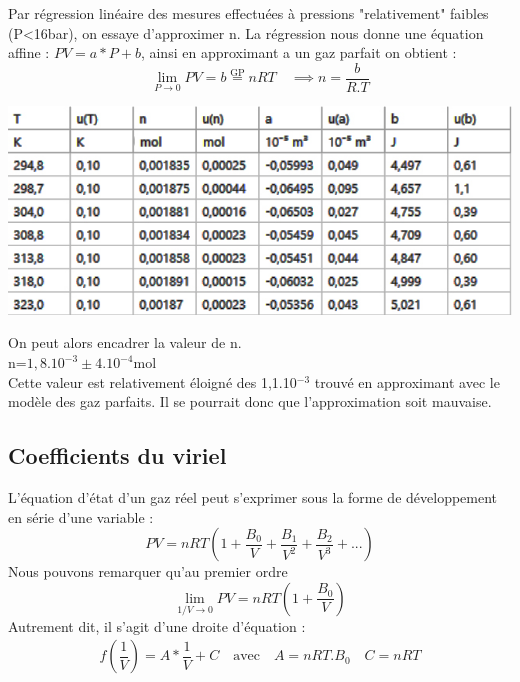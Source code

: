 \documentclass[12pt,a4paper]{article}
\begin{document}
Par régression linéaire des mesures effectuées à pressions "relativement" faibles (P<16bar), on essaye d'approximer n. La régression nous donne une équation affine : $PV=a*P+b$, ainsi en approximant a un gaz parfait on obtient : \[\lim_{P \to 0} PV = b \stackrel{\text{GP}}{=} nRT \quad \implies n=\dfrac{b}{R.T}\]
\begin{center}
\includegraphics[scale=0.5]{nAmagat}\\
\end{center}
On peut alors encadrer la valeur de n.\\ n=$1,8.10^{-3}\pm{4.10^{-4}}$mol\\
Cette valeur est relativement éloigné des  1,1.10$^{-3}$ trouvé en approximant avec le modèle des gaz parfaits. Il se pourrait donc que l'approximation soit mauvaise.

\subsection{Coefficients du viriel}
L'équation d'état d'un gaz réel peut s'exprimer sous la forme de
développement en série d'une variable : \[PV=nRT\left( 1+\dfrac {B_{0}} {V}+\dfrac {B_{1}} {V^{2}}+\dfrac {B_{2}} {V^{3}}+...\right)\]
Nous pouvons remarquer qu'au premier ordre \[\lim_{1/V \to 0} PV = nRT\left( 1+\dfrac {B_{0}} {V}\right)\]Autrement dit, il s'agit d'une droite d'équation : 
\[
\begin{aligned}
f(\dfrac{1}{V})=A*\dfrac{1}{V}+C \quad \text{avec} \quad A=nRT.B_{0} \quad C=nRT
\end{aligned}
\]
\end{document}
